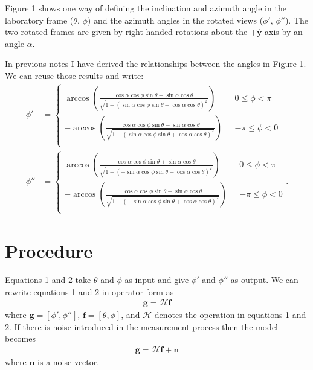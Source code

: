 \documentclass[11pt]{article}
\providecommand{\mb}[1]{\mathbf{#1}}
\providecommand{\mh}[1]{\mathbf{\hat{#1}}}
\begin{document}
Figure 1 shows one way of defining the inclination and azimuth angle in the
laboratory frame ($\theta$, $\phi$) and the azimuth angles in the rotated views
($\phi'$, $\phi''$). The two rotated frames are given by right-handed rotations
about the $+\mh{y}$ axis by an angle $\alpha$.

In
\href{https://github.com/talonchandler/dipsim/blob/master/notes/2017-06-09-rotated-frames/report/report.pdf}{previous
  notes} I have derived the relationships between the angles in Figure 1. We can
reuse those results and write:
\begin{align}
  \phi' &=
          \begin{cases}
            \arccos\left(\frac{\cos\alpha\cos\phi\sin\theta - \sin\alpha\cos\theta}{\sqrt{1 - (\sin\alpha\cos\phi\sin\theta + \cos\alpha\cos\theta)^2}}\right) \ \ \ &0 \leq \phi < \pi\\
            -\arccos\left(\frac{\cos\alpha\cos\phi\sin\theta - \sin\alpha\cos\theta}{\sqrt{1 - (\sin\alpha\cos\phi\sin\theta + \cos\alpha\cos\theta)^2}}\right) \ \ \ &-\pi \leq \phi < 0\\
            \end{cases}\\
  \phi'' &=
          \begin{cases}
            \arccos\left(\frac{\cos\alpha\cos\phi\sin\theta + \sin\alpha\cos\theta}{\sqrt{1 - (-\sin\alpha\cos\phi\sin\theta + \cos\alpha\cos\theta)^2}}\right) \ \ \ &0 \leq \phi < \pi\\
            -\arccos\left(\frac{\cos\alpha\cos\phi\sin\theta + \sin\alpha\cos\theta}{\sqrt{1 - (-\sin\alpha\cos\phi\sin\theta + \cos\alpha\cos\theta)^2}}\right) \ \ \ &-\pi \leq \phi < 0\\            
          \end{cases}.
\end{align}

\section{Procedure}
Equations 1 and 2 take $\theta$ and $\phi$ as input and give $\phi'$ and
$\phi''$ as output. We can rewrite equations 1 and 2 in operator form as
\begin{align}
  \mb{g} = \mathcal{H}\mb{f}
\end{align}
where $\mb{g} = [\phi', \phi'']$, $\mb{f} = [\theta, \phi]$, and $\mathcal{H}$
denotes the operation in equations 1 and 2. If there is noise introduced in the
measurement process then the model becomes
\begin{align}
  \mb{g} = \mathcal{H}\mb{f} + \mb{n}
\end{align}
where $\mb{n}$ is a noise vector.
\end{document}
